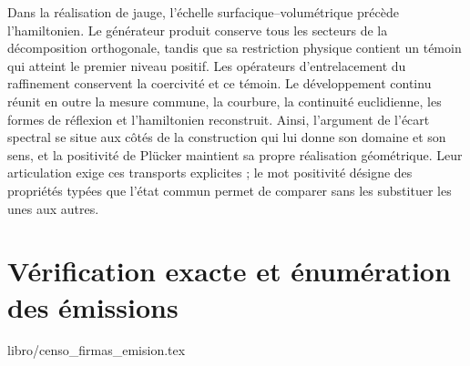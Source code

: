 \documentclass[a4paper,10pt]{article}
\theoremstyle{definition}\newtheorem{definition}[theorem]{Définition}
\theoremstyle{remark}\newtheorem{remark}[theorem]{Remarque}
\numberwithin{equation}{section}
\begin{document}
Dans la réalisation de jauge, l'échelle surfacique--volumétrique précède l'hamiltonien. Le générateur produit conserve tous les secteurs de la décomposition orthogonale, tandis que sa restriction physique contient un témoin qui atteint le premier niveau positif. Les opérateurs d'entrelacement du raffinement conservent la coercivité et ce témoin. Le développement continu réunit en outre la mesure commune, la courbure, la continuité euclidienne, les formes de réflexion et l'hamiltonien reconstruit. Ainsi, l'argument de l'écart spectral se situe aux côtés de la construction qui lui donne son domaine et son sens, et la positivité de Plücker maintient sa propre réalisation géométrique. Leur articulation exige ces transports explicites ; le mot positivité désigne des propriétés typées que l'état commun permet de comparer sans les substituer les unes aux autres.

\clearpage
\part{Vérification exacte et énumération des émissions}

\begingroup\setlength{\parskip}{2pt}\fontsize{10}{11.5}\selectfont
{libro/censo_firmas_emision.tex}
\par\endgroup
\begingroup\setlength{\parskip}{2pt}\fontsize{10}{11.5}\selectfont

\par\endgroup
\end{document}
